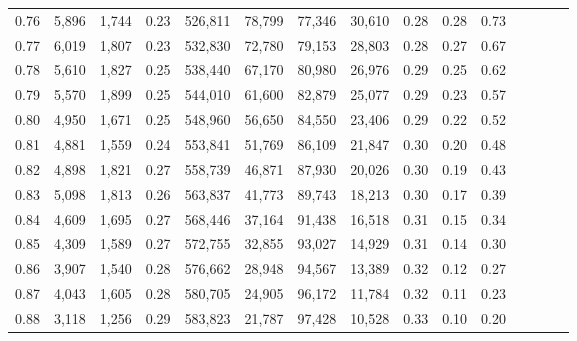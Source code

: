\begin{tabular}{rrrcrrrrrrrrrrr}
0.76 &   5,896 &  1,744 &                                       0.23 &  526,811 &   78,799 &   77,346 &   30,610 &  0.28 &  0.28 &                         0.73 \\
0.77 &   6,019 &  1,807 &                                       0.23 &  532,830 &   72,780 &   79,153 &   28,803 &  0.28 &  0.27 &                         0.67 \\
0.78 &   5,610 &  1,827 &                                       0.25 &  538,440 &   67,170 &   80,980 &   26,976 &  0.29 &  0.25 &                         0.62 \\
0.79 &   5,570 &  1,899 &                                       0.25 &  544,010 &   61,600 &   82,879 &   25,077 &  0.29 &  0.23 &                         0.57 \\
0.80 &   4,950 &  1,671 &                                       0.25 &  548,960 &   56,650 &   84,550 &   23,406 &  0.29 &  0.22 &                         0.52 \\
0.81 &   4,881 &  1,559 &                                       0.24 &  553,841 &   51,769 &   86,109 &   21,847 &  0.30 &  0.20 &                         0.48 \\
0.82 &   4,898 &  1,821 &                                       0.27 &  558,739 &   46,871 &   87,930 &   20,026 &  0.30 &  0.19 &                         0.43 \\
0.83 &   5,098 &  1,813 &                                       0.26 &  563,837 &   41,773 &   89,743 &   18,213 &  0.30 &  0.17 &                         0.39 \\
0.84 &   4,609 &  1,695 &                                       0.27 &  568,446 &   37,164 &   91,438 &   16,518 &  0.31 &  0.15 &                         0.34 \\
0.85 &   4,309 &  1,589 &                                       0.27 &  572,755 &   32,855 &   93,027 &   14,929 &  0.31 &  0.14 &                         0.30 \\
0.86 &   3,907 &  1,540 &                                       0.28 &  576,662 &   28,948 &   94,567 &   13,389 &  0.32 &  0.12 &                         0.27 \\
0.87 &   4,043 &  1,605 &                                       0.28 &  580,705 &   24,905 &   96,172 &   11,784 &  0.32 &  0.11 &                         0.23 \\
0.88 &   3,118 &  1,256 &                                       0.29 &  583,823 &   21,787 &   97,428 &   10,528 &  0.33 &  0.10 &                         0.20 \\

\end{tabular}
